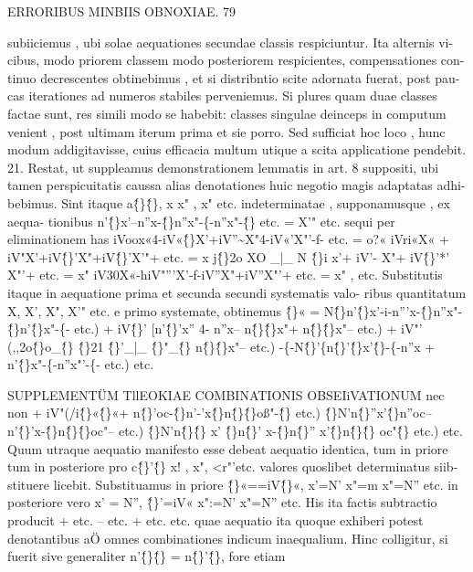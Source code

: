 \documentclass[12pt,a4paper]{article}
\begin{document}
\newpage
\begin{center}
\textsc{ERRORIBUS MINBIIS OBNOXIAE. 79}
\end{center}
subiiciemus , ubi solae aequationes secundae classis respiciuntur. Ita alternis vi-
cibus, modo priorem classem modo posteriorem respicientes, compensationes con-
tinuo decrescentes obtinebimus , et si distribntio scite adornata fuerat, post pau-
cas iterationes ad numeros stabiles perveniemus. Si plures quam duae classes
factae sunt, res simili modo se habebit: classes singulae deinceps in computum
venient , post ultimam iterum prima et sie porro. Sed sufficiat hoc loco , hunc
modum addigitavisse, cuius efficacia multum utique a scita applicatione pendebit.
21.
Restat, ut suppleamus demonstrationem lemmatis in art. 8 suppositi, ubi
tamen perspicuitatis caussa alias denotationes huic negotio magis adaptatas adhi-
bebimus.
Sint itaque a\^\{\}\^\{\}, x x" , x" etc. indeterminatae , supponamusque , ex aequa-
tionibus
n'\^\{\}x'--n''x-\^\{\}n''x"-\{-n''x"-\^\{\} etc. = X'"
etc.
sequi per eliminationem has
iVoox«4-iV«\^\{\}X'+iV''\~{}X"4-iV«'X"'-f- etc. = o?«
iVri«X« + iV"X'+iV\^\{\}'X"+iV\^\{\}'X'"+ etc. = x
j\^\{\}2o XO \_|\_ N \^\{\}i x'+ iV'- X"+ iV\^\{\}'*' X"'+ etc. = x"
iV30X«-hiV"'''X'-f-iV''X"+iV''X"'+ etc. = x" ,
etc.
Substitutis itaque in aequatione prima et secunda secundi systematis valo-
ribus quantitatum X, X', X", X'" etc. e primo systemate, obtinemus
\^\{\}« = N\^\{\}n'\^\{\}x'-i-n'''x-\^\{\}n''x"-\^\{\}n'\^\{\}x"-\{- etc.)
+ iV\^\{\}' [n'\^\{\}'x'' 4- n''x-- n\^\{\}\^\{\}x"+ n\^\{\}\^\{\}x"-- etc.)
+ iV"' (,,2o\^\{\}o\_\^\{\} \^\{\}21 \^\{\}'\_|\_  \^\{\}"\_\^\{\} n\^\{\}\^\{\}x"-- etc.)
-\{-N\^\{\}'\{n\^\{\}'\^\{\}x'\^\{\}-\{-n''x + n'\^\{\}x"-\{-n''x"'-\{- etc.) etc.

 SUPPLEMENTÜM TllEOKIAE COMBINATIONIS OBSEIiVATIONUM
nec non
+ iV"(/i\^\{\}«\^\{\}«+ n\^\{\}'oc-\^\{\}n'-'x\^\{\}n\^\{\}\^\{\}oß"-\^\{\} etc.)
\^\{\}N'n\^\{\}''x'\^\{\}n''oc--n'\^\{\}'x-\^\{\}n\^\{\}\^\{\}oc"-- etc.)
\^\{\}N'n\^\{\}\^\{\} x' \^\{\}n\^\{\}' x-\^\{\}n\^\{\}'' x'\^\{\}n\^\{\}\^\{\} oc"\^\{\} etc.) etc.
Quum utraque aequatio manifesto esse debeat aequatio identica, tum in
priore tum in posteriore pro c\^\{\}'\^\{\} x! , x", <r"'etc. valores quoslibet determinatus siib-
stituere licebit. Substituamus in priore
\^\{\}«==iV\^\{\}«, x'=N' x"=m x"=N'' etc.
in posteriore vero
x' = N'', \^\{\}'=iV« x":=N' x"=N'' etc.
His ita factis subtractio producit
+ etc.
-- etc.
+ etc. etc.
quae aequatio ita quoque exhiberi potest
denotantibus aÖ omnes combinationes indicum inaequalium.
Hinc colligitur, si fuerit
sive generaliter n'\^\{\}\^\{\} = n\^\{\}'\^\{\}, fore etiam
\end{document}
